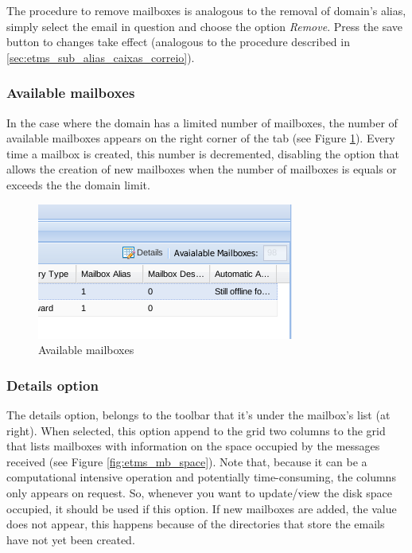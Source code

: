 The procedure to remove mailboxes is analogous to the removal of domain's alias, simply select the email in question and choose the option \textit{Remove}. Press the save button to changes take effect (analogous to the procedure described in \ref{sec:etms_sub_alias_caixas_correio}).

\subsubsection{Available mailboxes}
\label{sec:etms_sub_disponiveis_caixas_correio}
In the case where the domain has a limited number of mailboxes, the number of available mailboxes appears on the right corner of the tab (see Figure \ref{fig:etms_free_mb}). Every time a mailbox is created, this number is decremented, disabling the option that allows the creation of new mailboxes when the number of mailboxes is equals or exceeds the the domain limit.

\begin{figure}[H]
    \begin{center}
    \includegraphics[scale=0.6]{screenshots/etms/etms_free_mb.png}
    \caption{Available mailboxes}
    \label{fig:etms_free_mb}
    \end{center}
\end{figure}

\subsubsection{Details option}
\label{sec:etms_sub_detalhes_caixas_correio}
The details option, belongs to the toolbar that it's under the mailbox's list (at right). When selected, this option append to the grid two columns to the grid that lists mailboxes with information on the space occupied by the messages received (see Figure \ref{fig:etms_mb_space}). Note that, because it can be a computational intensive operation and potentially time-consuming, the columns only appears on request. So, whenever you want to update/view the disk space occupied, it should be used if this option. If new mailboxes are added, the value does not appear, this happens because of the directories that store the emails have not yet been created.

